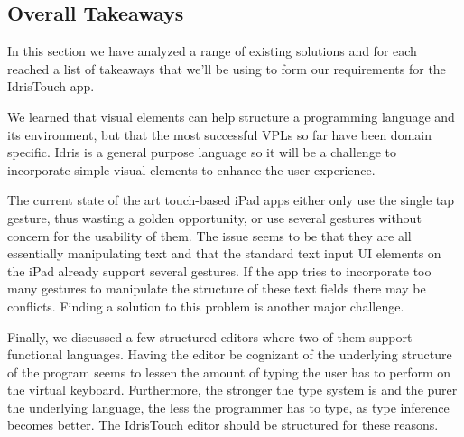 \subsection{Overall Takeaways}
In this section we have analyzed a range of existing solutions and for each reached a list of takeaways that we'll be using to form our requirements for the IdrisTouch app.

We learned that visual elements can help structure a programming language and its environment, but that the most successful VPLs so far have been domain specific. Idris is a general purpose language so it will be a challenge to incorporate simple visual elements to enhance the user experience.

The current state of the art touch-based iPad apps either only use the single tap gesture, thus wasting a golden opportunity, or use several gestures without concern for the usability of them. The issue seems to be that they are all essentially manipulating text and that the standard text input UI elements on the iPad already support several gestures. If the app tries to incorporate too many gestures to manipulate the structure of these text fields there may be conflicts. Finding a solution to this problem is another major challenge.

Finally, we discussed a few structured editors where two of them support functional languages. Having the editor be cognizant of the underlying structure of the program seems to lessen the amount of typing the user has to perform on the virtual keyboard. Furthermore, the stronger the type system is and the purer the underlying language, the less the programmer has to type, as type inference becomes better. The IdrisTouch editor should be structured for these reasons.















